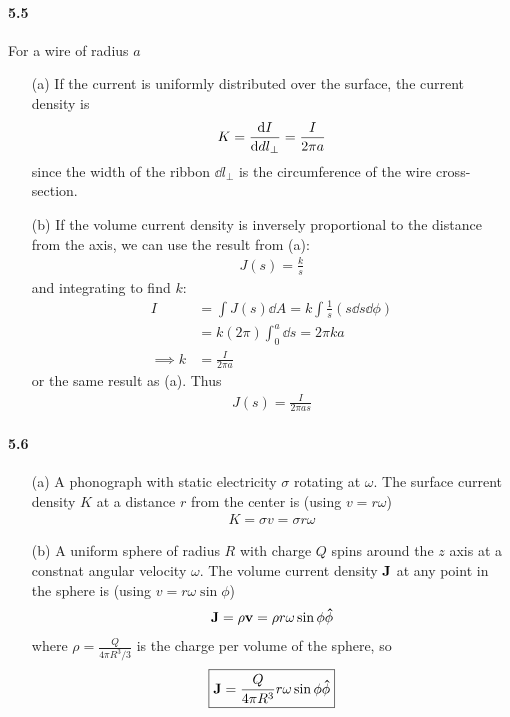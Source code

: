 \documentclass[../main.tex]{subfiles}
\begin{document}
\newpage
\paragraph{5.5} For a wire of radius $a$
\begin{enumerate}
    \item [(a)] If the current is uniformly distributed over the surface, the current density is
    \begin{align*}
        K = \dv{I}{dl_\perp} = \frac{I}{2\pi a}
    \end{align*}
    since the width of the ribbon $\dd{l_\perp}$ is the circumference of the wire cross-section.
    \item [(b)] If the volume current density is inversely proportional to the distance from the axis,
    we can use the result from (a):
    \begin{align*}
        J(s) = \frac{k}{s}
    \end{align*}
    and integrating to find $k$:
    \begin{align*}
        I &= \int J(s) \dd{A} = k \int \frac{1}{s} (s \dd{s} \dd{\phi}) \\
        &= k (2\pi) \int_0^a \dd{s} = 2\pi k a \\
        \implies k &= \frac{I}{2\pi a}
    \end{align*}
    or the same result as (a). Thus
    \begin{align*}
        \boxed{
            J(s) = \frac{I}{2\pi a s}
        }
    \end{align*}
\end{enumerate}

\newpage
\paragraph{5.6}
\begin{enumerate}
    \item [(a)] A phonograph with static electricity $\sigma$ rotating at $\omega$.
    The surface current density $K$ at a distance $r$ from the center is (using $v = r\omega$)
    \begin{align*}
        K = \sigma v = \boxed{\sigma r \omega}
    \end{align*}
    \item [(b)] A uniform sphere of radius $R$ with charge $Q$ spins around the $z$ axis at a constnat angular velocity $\omega$.
    The volume current density $\vb J$ at any point in the sphere is (using $v = r\omega \sin\phi$)
    \begin{align*}
        \vb J = \rho \vb v = \rho r \omega \sin\phi \vu \phi
    \end{align*}
    where $\rho = \frac{Q}{4\pi R^3/3}$ is the charge per volume of the sphere, so 
    \begin{align*}
        \boxed{
            \vb J = \frac{Q}{4\pi R^3} r \omega \sin\phi \vu \phi
        }
    \end{align*}
\end{enumerate}
\end{document}
